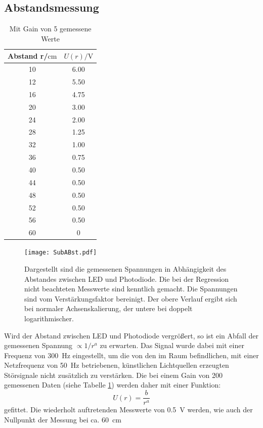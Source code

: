 \subsection{Abstandsmessung}
\label{chapter:Abst}
\begin{table}
  \centering
  \caption{Mit Gain von 5 gemessene Werte}
  \label{tab:2}
  \begin{tabular}{c c}
    \toprule
    Abstand r/$\si{\centi\metre}$ & $U(r)/\si{\volt}$\\
    \midrule
    10 & 6.00 \\
    12 & 5.50 \\
    16 & 4.75 \\
    20 & 3.00 \\
    24 & 2.00 \\
    28 & 1.25 \\
    32 & 1.00 \\
    36 & 0.75 \\
    40 & 0.50 \\
    44 & 0.50 \\
    48 & 0.50 \\
    52 & 0.50 \\
    56 & 0.50 \\
    60 & 0 \\
    \bottomrule
  \end{tabular}
\end{table}
\begin{figure}
  \centering
     \texttt{[image: SubABst.pdf]}
  \caption{Dargestellt sind die gemessenen Spannungen in Abhängigkeit des Abstandes zwischen LED und Photodiode. Die bei der Regression nicht
  beachteten Messwerte sind kenntlich gemacht.
  Die Spannungen sind vom Verstärkungsfaktor bereinigt. Der obere Verlauf ergibt sich bei normaler Achsenskalierung,
  der untere bei doppelt logarithmischer.}
  \label{plot:2}
\end{figure}
Wird der Abstand zwischen LED und Photodiode vergrößert, so ist ein Abfall der gemessenen Spannung $\propto 1/r^a$ zu erwarten.
Das Signal wurde dabei mit einer Frequenz von \SI{300}{\hertz} eingestellt, um die von den im Raum
befindlichen, mit einer Netzfrequenz von \SI{50}{\hertz} betriebenen, künstlichen Lichtquellen erzeugten
Störsignale nicht zusätzlich zu verstärken. Die bei einem Gain von 200 gemessenen Daten
(siehe Tabelle \ref{tab:2}) werden daher mit einer Funktion:
\begin{equation}
  U(r) = \frac{b}{r^a}
\end{equation}
gefittet. Die wiederholt auftretenden Messwerte von \SI{0.5}{\volt} werden, wie auch der Nullpunkt der Messung bei ca. \SI{60}{\centi\metre}
